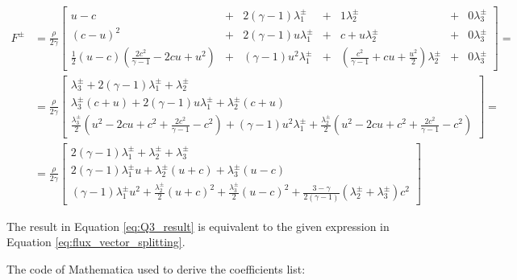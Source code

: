\begin{align}
    F^\pm & = \frac{\rho}{2\gamma} \begin{bmatrix}
                                       u-c                                                   & + & 2 (\gamma -1) \lambda_1^\pm    & + & 1    \lambda_2^\pm                                          & + & 0 \lambda_3^\pm \\
                                       (c-u)^2                                               & + & 2 (\gamma - 1) u \lambda_1^\pm & + & c+u  \lambda_2^\pm                                          & + & 0 \lambda_3^\pm \\
                                       \frac{1}{2} (u-c) (\frac{2 c^2}{\gamma -1}-2 c u+u^2) & + & (\gamma -1) u^2 \lambda_1^\pm  & + & (\frac{c^2}{\gamma -1} + c u + \frac{u^2}{2}) \lambda_2^\pm & + & 0 \lambda_3^\pm
                                   \end{bmatrix} =         \\
          & =   \frac{\rho}{2\gamma} \begin{bmatrix}
                                         \lambda_3^\pm + 2 (\gamma -1) \lambda_1^\pm                                                                 + \lambda_2^\pm       \\
                                         \lambda_3^\pm (c+u) + 2 (\gamma - 1) u \lambda_1^\pm                                                        + \lambda_2^\pm (c+u) \\
                                         \frac{\lambda_3^\pm}{2} (u^2 - 2 c u + c^2 + \frac{2 c^2}{\gamma -1} - c^2) + (\gamma -1) u^2 \lambda_1^\pm + \frac{\lambda_2^\pm}{2} (u^2 - 2 c u + c^2 + \frac{2 c^2}{\gamma -1} - c^2)
                                     \end{bmatrix} = \\
          & = \frac{\rho}{2\gamma} \begin{bmatrix}
                                       2 (\gamma -1) \lambda_1^\pm + \lambda_2^\pm + \lambda_3^\pm                   \\
                                       2 (\gamma -1) \lambda_1^\pm u + \lambda_2^\pm (u + c) + \lambda_3^\pm (u - c) \\
                                       (\gamma - 1) \lambda_1^\pm u^2 + \frac{\lambda_2^\pm}{2} (u + c)^2 + \frac{\lambda_3^\pm}{2} (u - c)^2 + \frac{3-\gamma}{2(\gamma - 1)} (\lambda_2^\pm + \lambda_3^\pm) c^2
                                   \end{bmatrix}
    \label{eq:Q3_result}
\end{align}

The result in Equation \ref{eq:Q3_result} is equivalent to the given expression in Equation \ref{eq:flux_vector_splitting}.

The code of Mathematica used to derive the coefficients list:





